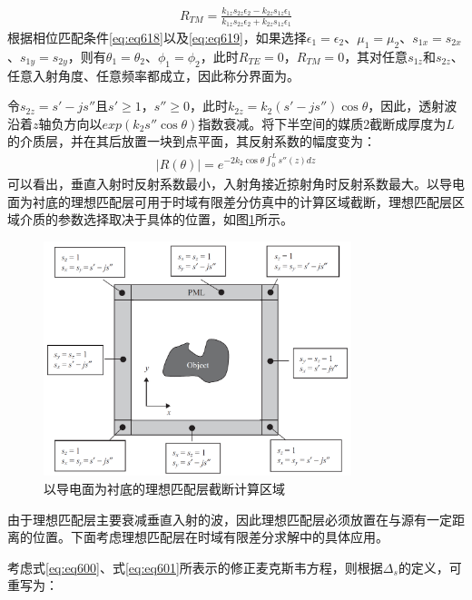 \documentclass{article}
\numberwithin{equation}{section}
\begin{document}
\begin{align}
    \label{eq:eq621}
    R_{TM}=\frac{k_{1z}s_{2z}\epsilon_2-k_{2z}s_{1z}\epsilon_1}{k_{1z}s_{2z}\epsilon_2+k_{2z}s_{1z}\epsilon_1}
\end{align}
根据相位匹配条件\ref{eq:eq618}以及\ref{eq:eq619}，如果选择$\epsilon_1=\epsilon_2$、$\mu_1=\mu_2$、$s_{1x}=s_{2x}$、$s_{1y}=s_{2y}$，则有$\theta_1=\theta_2$、$\phi_1=\phi_2$，此时$R_{TE}=0$，$R_{TM}=0$，其对任意$s_{1z}$和$s_{2z}$、任意入射角度、任意频率都成立，因此称分界面为\textbf{\color{blue}{理想匹配分界面}}。\par
令$s_{2z}=s'-js''$且$s'\geq 1$，$s''\geq 0$，此时$k_{2z}=k_2(s'-js'')\cos\theta$，因此，透射波沿着$z$轴负方向以$exp(k_2s''\cos\theta)$指数衰减。将下半空间的媒质2截断成厚度为$L$的介质层，并在其后放置一块到点平面，其反射系数的幅度变为：
\begin{align}
    \label{eq:eq622}
    |R(\theta)|=e^{-2k_2\cos\theta\int_0^Ls''(z)dz}
\end{align}
可以看出，垂直入射时反射系数最小，入射角接近掠射角时反射系数最大。以导电面为衬底的理想匹配层可用于时域有限差分仿真中的计算区域截断，理想匹配层区域介质的参数选择取决于具体的位置，如图\ref{fig:fig53}所示。
\begin{figure}[ht]
    \centering
    \includegraphics[width=0.8\textwidth]{以导电面为衬底的理想匹配层截断计算区域.PNG}
    \caption{以导电面为衬底的理想匹配层截断计算区域}
    \label{fig:fig53}
\end{figure}
\par
由于理想匹配层主要衰减垂直入射的波，因此理想匹配层必须放置在与源有一定距离的位置。下面考虑理想匹配层在时域有限差分求解中的具体应用。\par
考虑式\ref{eq:eq600}、式\ref{eq:eq601}所表示的修正麦克斯韦方程，则根据$\Delta_s$的定义，可重写为：
\end{document}
